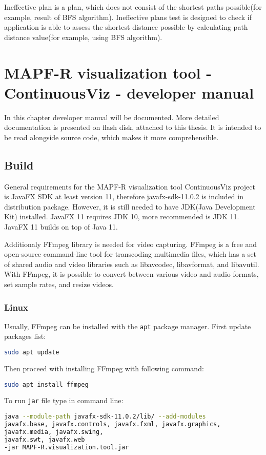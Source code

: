 \documentclass[thesis=B,english]{FITthesis}[2019/12/23]
\begin{document}
Ineffective plan is a plan, which does not consist of the shortest paths possible(for example, result of BFS algorithm). Ineffective plans test is designed to check if application is able to assess the shortest distance possible by calculating path distance value(for example, using BFS algorithm). 

\chapter{MAPF-R visualization tool - ContinuousViz - developer manual}

In this chapter developer manual will be documented. More detailed documentation is presented on flash disk, attached to this thesis. It is intended to be read alongside source code, which makes it more comprehensible.

\section{Build}
 
General requirements for the MAPF-R visualization tool ContinuousViz project is JavaFX SDK at least version 11, therefore javafx-sdk-11.0.2 is included in distribution package. However, it is still needed to have JDK(Java Development Kit) installed. JavaFX 11 requires JDK 10, more recommended is JDK 11. JavaFX 11 builds on top of Java 11.

Additionaly FFmpeg library is needed for video capturing. FFmpeg is a free and open-source command-line tool for transcoding multimedia files, which has a set of shared audio and video libraries such as libavcodec, libavformat, and libavutil. With FFmpeg, it is possible to convert between various video and audio formats, set sample rates, and resize videos.

\subsection{Linux}

Usually, FFmpeg can be installed with the \verb|apt| package manager. First update packages list:
\begin{lstlisting}[language=bash]
sudo apt update
\end{lstlisting}
Then proceed with installing FFmpeg with following command:
\begin{lstlisting}[language=bash]
sudo apt install ffmpeg
\end{lstlisting}

To run \verb|jar| file type in command line:
\begin{lstlisting}[language=bash]
java --module-path javafx-sdk-11.0.2/lib/ --add-modules 
javafx.base, javafx.controls, javafx.fxml, javafx.graphics, 
javafx.media, javafx.swing, 
javafx.swt, javafx.web
-jar MAPF-R.visualization.tool.jar
\end{lstlisting}
\end{document}
